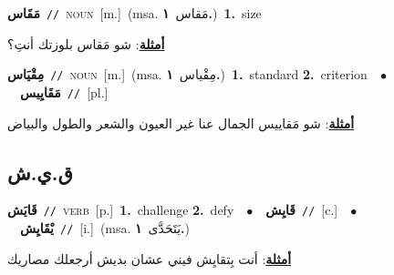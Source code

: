 \documentclass[10pt,a4paper,twoside]{article} %
\begin{document}
\begin{multicols}{2}
{\setlength\topsep{0pt}\textbf{\foreignlanguage{arabic}{مَقَاس}}\ {\color{gray}\texttt{//}\color{black}}\ \textsc{noun}\ [m.]\ \color{gray}(msa. \foreignlanguage{arabic}{مَقاس}~\foreignlanguage{arabic}{\textbf{١.}})\color{black}\ \textbf{1.}~size\  \begin{flushright}\color{gray}\foreignlanguage{arabic}{\textbf{\underline{\foreignlanguage{arabic}{أمثلة}}}: شو مَقاس بلوزتك أنتِ؟}\end{flushright}\color{black}} \vspace{2mm}

{\setlength\topsep{0pt}\textbf{\foreignlanguage{arabic}{مِقْيَاس}}\ {\color{gray}\texttt{//}\color{black}}\ \textsc{noun}\ [m.]\ \color{gray}(msa. \foreignlanguage{arabic}{مِقْياس}~\foreignlanguage{arabic}{\textbf{١.}})\color{black}\ \textbf{1.}~standard  \textbf{2.}~criterion\ \ $\bullet$\ \ \setlength\topsep{0pt}\textbf{\foreignlanguage{arabic}{مَقَايِيس}}\ {\color{gray}\texttt{//}\color{black}}\ [pl.]\  \begin{flushright}\color{gray}\foreignlanguage{arabic}{\textbf{\underline{\foreignlanguage{arabic}{أمثلة}}}: شو مَقاييس الجمال عنا غير العيون والشعر والطول والبياض}\end{flushright}\color{black}} \vspace{2mm}

\vspace{-3mm}
\subsection*{\color{blue}\foreignlanguage{arabic}{ق.ي.ش}\color{blue}{}} 

{\setlength\topsep{0pt}\textbf{\foreignlanguage{arabic}{قَايَش}}\ {\color{gray}\texttt{//}\color{black}}\ \textsc{verb}\ [p.]\ \textbf{1.}~challenge  \textbf{2.}~defy\ \ $\bullet$\ \ \setlength\topsep{0pt}\textbf{\foreignlanguage{arabic}{قَايِش}}\ {\color{gray}\texttt{//}\color{black}}\ [c.]\ \ $\bullet$\ \ \setlength\topsep{0pt}\textbf{\foreignlanguage{arabic}{يْقَايِش}}\ {\color{gray}\texttt{//}\color{black}}\ [i.]\ \color{gray}(msa. \foreignlanguage{arabic}{يَتَحَدَّى}~\foreignlanguage{arabic}{\textbf{١.}})\color{black}\  \begin{flushright}\color{gray}\foreignlanguage{arabic}{\textbf{\underline{\foreignlanguage{arabic}{أمثلة}}}: أنت بِتقايِش فيني عشان بديش أرجعلك مصاريك}\end{flushright}\color{black}} \vspace{2mm}


\end{multicols}
\end{document}
